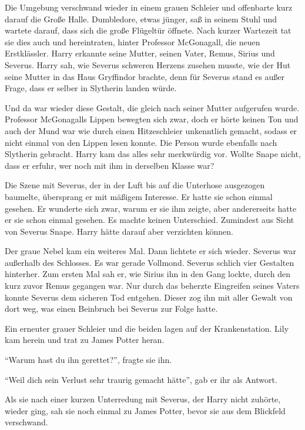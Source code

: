 \begin{traum}
Die Umgebung verschwand wieder in einem grauen Schleier und offenbarte kurz darauf die Große Halle. Dumbledore, etwas jünger, saß in seinem Stuhl und wartete darauf, dass sich die große Flügeltür öffnete. Nach kurzer Wartezeit tat sie dies auch und hereintraten, hinter Professor McGonagall, die neuen Erstklässler. Harry erkannte seine Mutter, seinen Vater, Remus, Sirius und Severus. Harry sah, wie Severus schweren Herzens zusehen musste, wie der Hut seine Mutter in das Haus Gryffindor brachte, denn für Severus stand es außer Frage, dass er selber in Slytherin landen würde.

Und da war wieder diese Gestalt, die gleich nach seiner Mutter aufgerufen wurde. Professor McGonagalls Lippen bewegten sich zwar, doch er hörte keinen Ton und auch der Mund war wie durch einen Hitzeschleier unkenntlich gemacht, sodass er nicht einmal von den Lippen lesen konnte. Die Person wurde ebenfalls nach Slytherin gebracht. Harry kam das alles sehr merkwürdig vor. Wollte Snape nicht, dass er erfuhr, wer noch mit ihm in derselben Klasse war?

Die Szene mit Severus, der in der Luft bis auf die Unterhose ausgezogen baumelte, übersprang er mit mäßigem Interesse. Er hatte sie schon einmal gesehen. Er wunderte sich zwar, warum er sie ihm zeigte, aber andererseits hatte er sie schon einmal gesehen. Es machte keinen Unterschied. Zumindest aus Sicht von Severus Snape. Harry hätte darauf aber verzichten können.

Der graue Nebel kam ein weiteres Mal. Dann lichtete er sich wieder. Severus war außerhalb des Schlosses. Es war gerade Vollmond. Severus schlich vier Gestalten hinterher. Zum ersten Mal sah er, wie Sirius ihn in den Gang lockte, durch den kurz zuvor Remus gegangen war. Nur durch das beherzte Eingreifen seines Vaters konnte Severus dem sicheren Tod entgehen. Dieser zog ihn mit aller Gewalt von dort weg, was einen Beinbruch bei Severus zur Folge hatte.

Ein erneuter grauer Schleier und die beiden lagen auf der Krankenstation. Lily kam herein und trat zu James Potter heran.

\enquote{Warum hast du ihn gerettet?}, fragte sie ihn.

\enquote{Weil dich sein Verlust sehr traurig gemacht hätte}, gab er ihr als Antwort.

Als sie nach einer kurzen Unterredung mit Severus, der Harry nicht zuhörte, wieder ging, sah sie noch einmal zu James Potter, bevor sie aus dem Blickfeld verschwand.
\end{traum}

